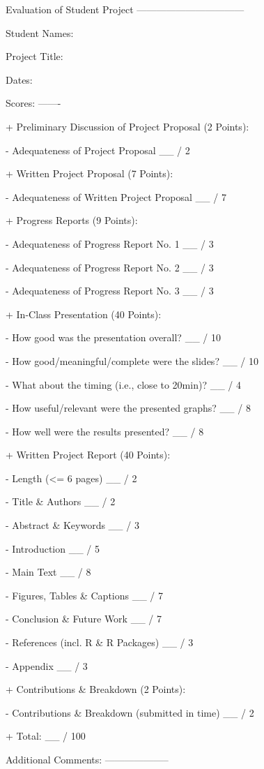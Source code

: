 Evaluation of Student Project
---------------------------------

Student Names:                

Project Title:  

Dates: 


Scores:
-------

+ Preliminary Discussion of Project Proposal (2 Points):

    - Adequateness of Project Proposal
      __ / 2


+ Written Project Proposal (7 Points):

    - Adequateness of Written Project Proposal
      __ / 7
          
          
+ Progress Reports (9 Points): 

    - Adequateness of Progress Report No. 1
      __ / 3

    - Adequateness of Progress Report No. 2
      __ / 3
          
    - Adequateness of Progress Report No. 3
      __ / 3
      
          
+ In-Class Presentation (40 Points): 

    - How good was the presentation overall?                          
      __ / 10
     
    - How good/meaningful/complete were the slides?                          
      __ / 10
      
    - What about the timing (i.e., close to 20min)?           
      __ / 4
      
    - How useful/relevant were the presented graphs?                                   
      __ / 8
      
    - How well were the results presented?                   
      __ / 8
      

+ Written Project Report (40 Points): 

   - Length (<= 6 pages)
     __ / 2
     
   - Title & Authors
     __ / 2
      
   - Abstract & Keywords
     __ / 3
        
   - Introduction
     __ / 5
     
   - Main Text
     __ / 8
          
   - Figures, Tables & Captions
     __ / 7
     
   - Conclusion & Future Work
     __ / 7
     
   - References (incl. R & R Packages)
     __ / 3
     
   - Appendix
     __ / 3
     
        
+ Contributions & Breakdown (2 Points): 

   - Contributions & Breakdown (submitted in time)
     __ / 2


+ Total:
    __ / 100


Additional Comments:
--------------------


